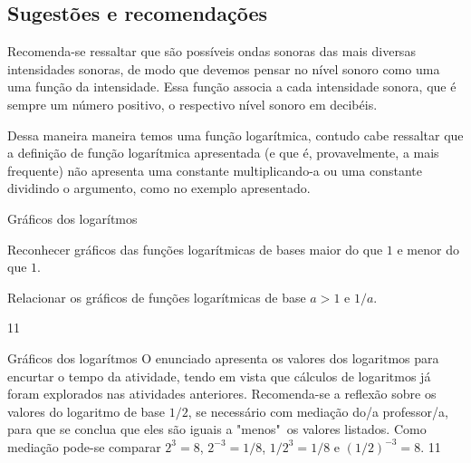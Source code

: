 \marginpar{\vspace{2em}}
\def\currentcolor{session4}
\begin{texto}
{
	\subsection{Sugestões e recomendações}
	Recomenda-se ressaltar que são possíveis ondas sonoras das mais diversas intensidades sonoras, de modo que devemos pensar no nível sonoro como uma uma função da intensidade. Essa função associa a cada intensidade sonora, que é sempre um número positivo, o respectivo nível sonoro em decibéis.

	Dessa maneira maneira temos uma função logarítmica, contudo cabe ressaltar que a definição de função logarítmica apresentada (e que é, provavelmente, a mais frequente) não apresenta uma constante multiplicando-a ou uma constante dividindo o argumento, como no exemplo apresentado.
}
\end{texto}
\clearmargin
\begin{objectives}{Gráficos dos logarítmos}
{
	Reconhecer gráficos das funções logarítmicas de bases maior do que $1$ e menor do que $1$.

Relacionar os gráficos de funções logarítmicas de base $a>1$ e $1/a$.
}{1}{1}
\end{objectives}
\begin{sugestions}{Gráficos dos logarítmos}
{
	O enunciado apresenta os valores dos logaritmos para encurtar o tempo da atividade, tendo em vista que cálculos de logaritmos já foram explorados nas atividades anteriores. Recomenda-se a reflexão sobre os valores do logaritmo de base $1/2$, se necessário com mediação do/a  professor/a, para que se conclua que eles são iguais a "menos"\, os valores listados. Como mediação pode-se comparar $2^3=8$, $2^{-3}=1/8$, $1/2^3=1/8$ e $(1/2)^{-3}=8$.
}{1}{1}
\end{sugestions}


